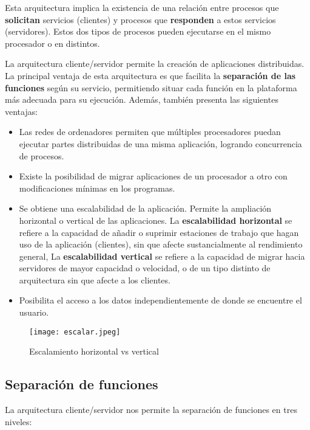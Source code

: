 Esta arquitectura implica la existencia de una relación entre procesos que \textbf{solicitan}
servicios (clientes) y procesos que \textbf{responden} a estos servicios (servidores). Estos
dos tipos de procesos pueden ejecutarse en el mismo procesador o en distintos.

La arquitectura cliente/servidor permite la creación de aplicaciones distribuidas.
La principal ventaja de esta arquitectura es que facilita la \textbf{separación de las funciones}
según su servicio, permitiendo situar cada función en la plataforma más adecuada
para su ejecución. Además, también presenta las siguientes ventajas:

\begin{itemize}
	\item Las redes de ordenadores permiten que múltiples procesadores puedan ejecutar
	partes distribuidas de una misma aplicación, logrando concurrencia de procesos.
	\item Existe la posibilidad de migrar aplicaciones de un procesador a otro con modificaciones mínimas en los programas.
	\item Se obtiene una escalabilidad de la aplicación. Permite la ampliación horizontal
	o vertical de las aplicaciones. La \textbf{escalabilidad horizontal} se refiere a la capacidad de añadir o suprimir estaciones de trabajo que hagan uso de la aplicación
	(clientes), sin que afecte sustancialmente al rendimiento general, La \textbf{escalabilidad vertical} se refiere a la capacidad de migrar hacia servidores
	de mayor capacidad o velocidad, o de un tipo distinto de arquitectura sin que
	afecte a los clientes.
	\item Posibilita el acceso a los datos independientemente de donde se encuentre el
usuario.
\end{itemize}	

\begin{figure}[H]
	\center
	\texttt{[image: escalar.jpeg]}
	\caption{Escalamiento horizontal vs vertical}
	\label{fig:super}
\end{figure}

\subsection{Separación de funciones}

La arquitectura cliente/servidor nos permite la separación de funciones en tres
niveles:

